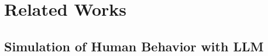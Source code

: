 \documentclass{article} %
\DeclareRobustCommand{\note}[1]{{\sethlcolor{orange!30!white}\hl{#1}}}
\begin{document}




\section{Related Works}
\subsection{Simulation of Human Behavior with LLM }
\end{document}
